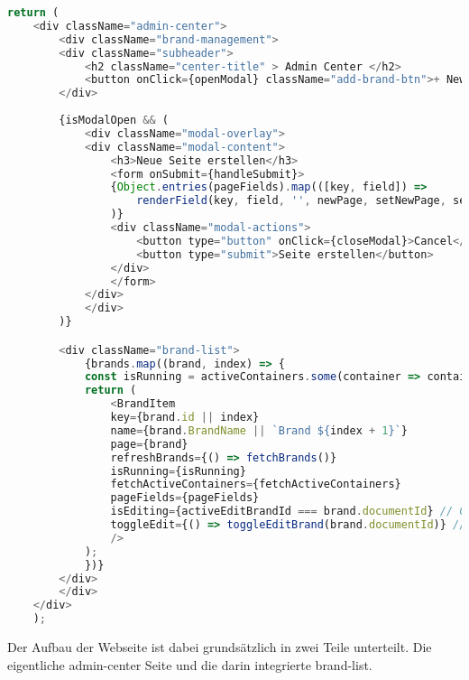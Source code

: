 \begin{lstlisting}[language=JavaScript, caption={AdminCenter.jsx Aufbau}, label={lst:admincenterjsxAufbau}]
return (
    <div className="admin-center">
        <div className="brand-management">
        <div className="subheader">
            <h2 className="center-title" > Admin Center </h2>
            <button onClick={openModal} className="add-brand-btn">+ New Page</button>
        </div>
        
        {isModalOpen && (
            <div className="modal-overlay">
            <div className="modal-content">
                <h3>Neue Seite erstellen</h3>
                <form onSubmit={handleSubmit}>
                {Object.entries(pageFields).map(([key, field]) => 
                    renderField(key, field, '', newPage, setNewPage, setError)
                )}
                <div className="modal-actions">
                    <button type="button" onClick={closeModal}>Cancel</button>
                    <button type="submit">Seite erstellen</button>
                </div>
                </form>
            </div>
            </div>
        )}

        <div className="brand-list">
            {brands.map((brand, index) => {
            const isRunning = activeContainers.some(container => container.name === `subbrand-${brand.documentId}`);
            return (
                <BrandItem
                key={brand.id || index}
                name={brand.BrandName || `Brand ${index + 1}`}
                page={brand}
                refreshBrands={() => fetchBrands()}
                isRunning={isRunning}
                fetchActiveContainers={fetchActiveContainers}
                pageFields={pageFields}
                isEditing={activeEditBrandId === brand.documentId} // Check if this brand is being edited
                toggleEdit={() => toggleEditBrand(brand.documentId)} // Toggle edit mode
                />
            );
            })}
        </div>
        </div>
    </div>
    );
\end{lstlisting}

Der Aufbau der Webseite ist dabei grundsätzlich in zwei Teile unterteilt. Die eigentliche admin-center Seite und die darin integrierte brand-list.